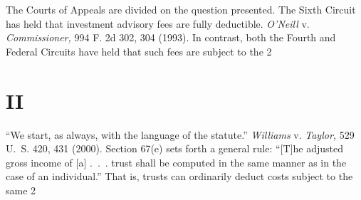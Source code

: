   The Courts of Appeals are divided on the question presented. The Sixth Circuit has held that investment advisory fees are fully deductible. \emph{O'Neill} v. \emph{Commissioner,} 994 F. 2d 302, 304 (1993). In contrast, both the Fourth and Federal Circuits have held that such fees are subject to the 2%

\section{II}

  ``We start, as always, with the language of the statute.'' \emph{Williams} v. \emph{Taylor,} 529 U.~S. 420, 431 (2000). Section 67(e) sets forth a general rule: ``[T]he adjusted gross income of [a] .~.~. trust shall be computed in the same manner as in the case of an individual.'' That is, trusts can ordinarily deduct costs subject to the same 2%

